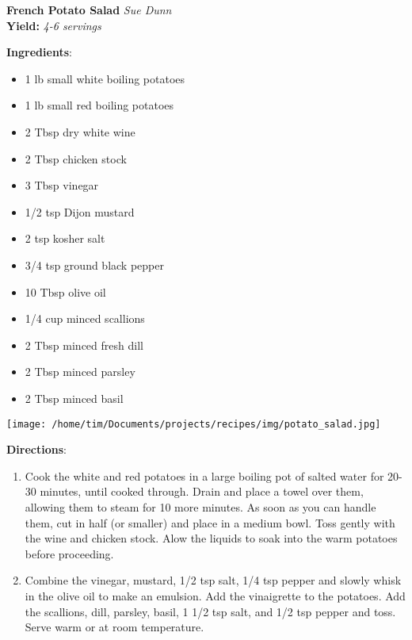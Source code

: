 \documentclass[11pt, twoside, openany]{book}
\begin{document}
\noindent\begin{minipage}[t]{\linewidth}%
{\Large\textbf{French Potato Salad}} \label{french-potato-salad}\hfill\textit{Sue Dunn}\\
\textbf{Yield:} \textit{4-6 servings}\\
\noindent\begin{minipage}[t]{0.78\linewidth}%
\textbf{Ingredients}:\vspace{-3mm}
\begin{multicols}{2}
\begin{itemize}\setlength\itemsep{-1mm}
\item 1 lb small white boiling potatoes
\item 1 lb small red boiling potatoes
\item 2 Tbsp dry white wine
\item 2 Tbsp chicken stock
\item 3 Tbsp vinegar
\item 1/2 tsp Dijon mustard
\item 2 tsp kosher salt
\item 3/4 tsp ground black pepper
\item 10 Tbsp olive oil
\item 1/4 cup minced scallions
\item 2 Tbsp minced fresh dill
\item 2 Tbsp minced parsley
\item 2 Tbsp minced basil
\end{itemize}
\end{multicols}
\end{minipage}
\noindent\begin{minipage}[t]{0.18\linewidth}
\centering \strut\vspace*{-\baselineskip}\newline
\texttt{[image: /home/tim/Documents/projects/recipes/img/potato\_salad.jpg]}\\
\end{minipage}\vspace{3mm}
\textbf{Directions}:
\vspace{-3mm}\begin{enumerate}\setlength\itemsep{-1mm}
\item Cook the white and red potatoes in a large boiling pot of salted water for 20-30 minutes, until cooked through. Drain and place a towel over them, allowing them to steam for 10 more minutes. As soon as you can handle them, cut in half (or smaller) and place in a medium bowl. Toss gently with the wine and chicken stock. Alow the liquids to soak into the warm potatoes before proceeding.
\item Combine the vinegar, mustard, 1/2 tsp salt, 1/4 tsp pepper and slowly whisk in the olive oil to make an emulsion. Add the vinaigrette to the potatoes. Add the scallions, dill, parsley, basil, 1 1/2 tsp salt, and 1/2 tsp pepper and toss. Serve warm or at room temperature.
\end{enumerate}
\end{minipage}\vspace{8mm}
\end{document}
